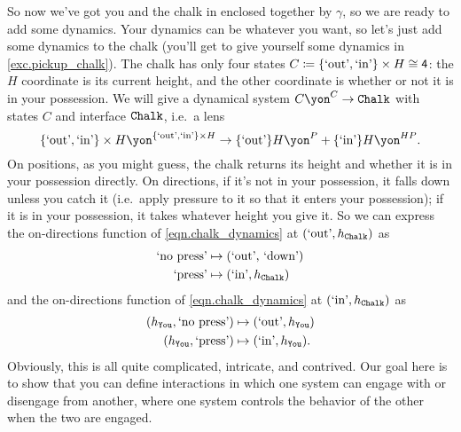 \documentclass[Book-Poly]{subfiles}
\begin{document}
\begin{example}
So now we've got you and the chalk in enclosed together by $\gamma$, so we are ready to add some dynamics.
Your dynamics can be whatever you want, so let's just add some dynamics to the chalk (you'll get to give yourself some dynamics in \cref{exc.pickup_chalk}).
The chalk has only four states $C\coloneqq \{\text{`out'}, \text{`in'}\} \times H \cong\textsf{4}$: the $H$ coordinate is its current height, and the other coordinate is whether or not it is in your possession.
We will give a dynamical system $C\yon^C\to\const{Chalk}$ with states $C$ and interface $\texttt{Chalk}$, i.e.\ a lens
\begin{equation}\label{eqn.chalk_dynamics}
	\{\text{`out'}, \text{`in'}\} \times H\yon^{\{\text{`out'}, \text{`in'}\} \times H}\to \{\text{`out'}\}H\yon^P + \{\text{`in'}\}H\yon^{HP}.
\end{equation}
On positions, as you might guess, the chalk returns its height and whether it is in your possession directly.
On directions, if it's not in your possession, it falls down unless you catch it (i.e.\ apply pressure to it so that it enters your possession); if it is in your possession, it takes whatever height you give it.
So we can express the on-directions function of \eqref{eqn.chalk_dynamics} at $(\text{`out'}, h_{\texttt{Chalk}})$ as
\begin{align*}
	\text{`no press'} &\mapsto (\text{`out', `down'}) \\
	\text{`press'} &\mapsto (\text{`in'}, h_{\texttt{Chalk}})
\end{align*}
and the on-directions function of \eqref{eqn.chalk_dynamics} at $(\text{`in'}, h_{\texttt{Chalk}})$ as
\begin{align*}
	(h_{\texttt{You}}, \text{`no press'}) &\mapsto (\text{`out'}, h_{\texttt{You}}) \\
	(h_{\texttt{You}}, \text{`press'}) &\mapsto (\text{`in'}, h_{\texttt{You}}).
\end{align*}
Obviously, this is all quite complicated, intricate, and contrived.
Our goal here is to show that you can define interactions in which one system can engage with or disengage from another, where one system controls the behavior of the other when the two are engaged.
\end{example}
\end{document}
